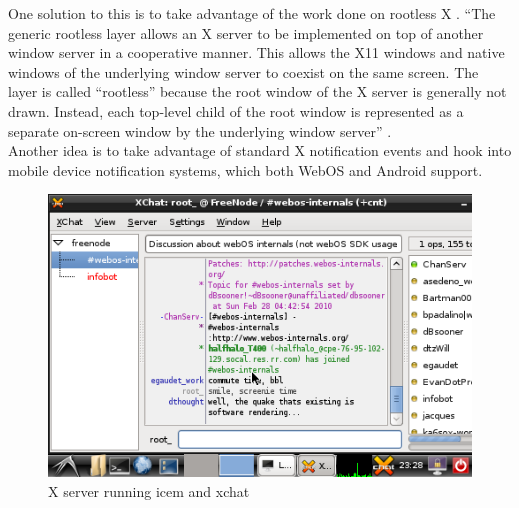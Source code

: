 One solution to this is to take advantage of the work done on rootless X \cite{rootless}.  ``The generic rootless layer allows an X server to be implemented on top of another window server in a cooperative manner. This allows the X11 windows and native windows of the underlying window server to coexist on the same screen. The layer is called ``rootless'' because the root window of the X server is generally not drawn. Instead, each top-level child of the root window is represented as a separate on-screen window by the underlying window server'' \cite{rootless}.\\

Another idea is to take advantage of standard X notification events \cite{notifications} and hook into mobile device notification systems, which both WebOS and Android support. 

\begin{figure}[tbh]
\centering
\includegraphics[width=1.0\columnwidth]{xchat1}
\caption{X server running icem and xchat}
\label{fig:x_screenie}
\end{figure}
